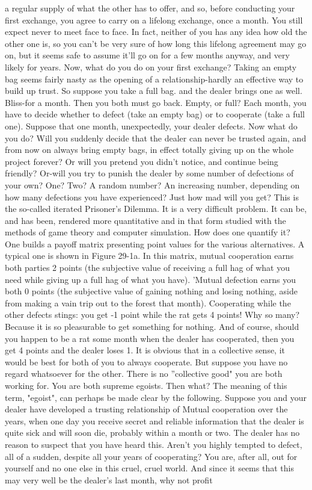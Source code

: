 a regular supply of what the other has to offer, and so, before conducting your first
exchange, you agree to carry on a lifelong exchange, once a month. You still expect
never to meet face to face. In fact, neither of you has any idea how old the other one is, so
you can't be very sure of how long this lifelong agreement may go on, but it seems safe to
assume it'll go on for a few months anyway, and very likely for years.
         Now, what do you do on your first exchange? Taking an empty bag seems fairly
nasty as the opening of a relationship-hardly an effective way to build up trust. So
suppose you take a full bag. and the dealer brings one as well. Bliss-for a month. Then
you both must go back. Empty, or full? Each month, you have to decide whether to defect
(take an empty bag) or to cooperate (take a full one). Suppose that one month,
unexpectedly, your dealer defects. Now what do you do? Will you suddenly decide that
the dealer can never be trusted again, and from now on always bring empty bags, in effect
totally giving up on the whole project forever? Or will you pretend you didn't notice, and
continue being friendly? Or-will you try to punish the dealer by some number of
defections of your own? One? Two? A random number? An increasing number,
depending on how many defections you have experienced? Just how mad will you get?
         This is the so-called iterated Prisoner's Dilemma. It is a very difficult problem. It
can be, and has been, rendered more quantitative and in that form studied with the
methods of game theory and computer simulation. How does one quantify it? One builds
a payoff matrix presenting point values for the various alternatives. A typical one is
shown in Figure 29-1a. In this matrix, mutual cooperation earns both parties 2 points (the
subjective value of receiving a full hag of what you need while giving up a full hag of
what you have). 'Mutual defection earns you both 0 points (the subjective value of
gaining nothing and losing nothing, aside from making a vain trip out to the forest that
month). Cooperating while the other defects stings: you get -1 point while the rat gets 4
points! Why so many? Because it is so pleasurable to get something for nothing. And of
course, should you happen to be a rat some month when the dealer has cooperated, then
you get 4 points and the dealer loses 1.
         It is obvious that in a collective sense, it would be best for both of you to always
cooperate. But suppose you have no regard whatsoever for the other. There is no
''collective good" you are both working for. You are both supreme egoists. Then what?
The meaning of this term, "egoist", can perhaps be made clear by the following. Suppose
you and your dealer have developed a trusting relationship of Mutual cooperation over
the years, when one day you receive secret and reliable information that the dealer is
quite sick and will soon die, probably within a month or two. The dealer has no reason to
suspect that you have heard this. Aren't you highly tempted to defect, all of a sudden,
despite all your years of cooperating? You are, after all, out for yourself and no one else
in this cruel, cruel world. And since it seems that this may very well be the dealer’s last
month, why not profit




